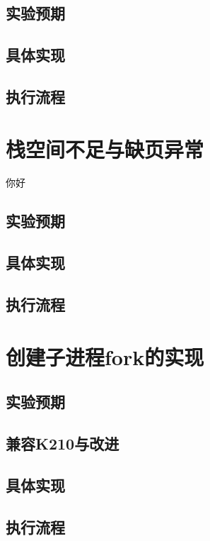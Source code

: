 \subsection{实验预期}

\subsection{具体实现}

\subsection{执行流程}

\section{栈空间不足与缺页异常}
你好
\subsection{实验预期}

\subsection{具体实现}

\subsection{执行流程}

\section{创建子进程fork的实现}

\subsection{实验预期}

\subsection{兼容K210与改进}

\subsection{具体实现}

\subsection{执行流程}


